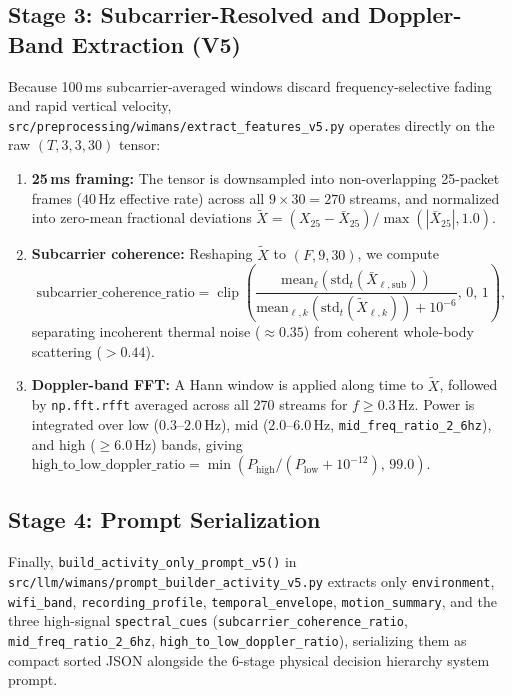 \documentclass[11pt,a4paper]{article}
\begin{document}
\subsection{Stage 3: Subcarrier-Resolved and Doppler-Band Extraction (V5)}
Because 100\,ms subcarrier-averaged windows discard frequency-selective fading and rapid vertical velocity, \texttt{src/preprocessing/wimans/extract\_features\_v5.py} operates directly on the raw $(T, 3, 3, 30)$ tensor:
\begin{enumerate}
    \item \textbf{25\,ms framing:} The tensor is downsampled into non-overlapping 25-packet frames ($40$\,Hz effective rate) across all $9 \times 30 = 270$ streams, and normalized into zero-mean fractional deviations $\tilde{X} = (X_{25} - \bar{X}_{25}) / \max(|\bar{X}_{25}|, 1.0)$.
    \item \textbf{Subcarrier coherence:} Reshaping $\tilde{X}$ to $(F, 9, 30)$, we compute
    \begin{equation}
        \text{subcarrier\_coherence\_ratio} = \operatorname{clip}\!\left(\frac{\text{mean}_{\ell}(\text{std}_t(\bar{X}_{\ell,\text{sub}}))}{\text{mean}_{\ell,k}(\text{std}_t(\tilde{X}_{\ell,k})) + 10^{-6}},\, 0,\, 1\right),
    \end{equation}
    separating incoherent thermal noise ($\approx 0.35$) from coherent whole-body scattering ($>0.44$).
    \item \textbf{Doppler-band FFT:} A Hann window is applied along time to $\tilde{X}$, followed by \texttt{np.fft.rfft} averaged across all 270 streams for $f \ge 0.3$\,Hz. Power is integrated over low ($0.3\text{--}2.0$\,Hz), mid ($2.0\text{--}6.0$\,Hz, \texttt{mid\_freq\_ratio\_2\_6hz}), and high ($\ge 6.0$\,Hz) bands, giving $\text{high\_to\_low\_doppler\_ratio} = \min(P_{\text{high}} / (P_{\text{low}} + 10^{-12}),\, 99.0)$.
\end{enumerate}

\subsection{Stage 4: Prompt Serialization}
Finally, \texttt{build\_activity\_only\_prompt\_v5()} in \texttt{src/llm/wimans/prompt\_builder\_activity\_v5.py} extracts only \texttt{environment}, \texttt{wifi\_band}, \texttt{recording\_profile}, \texttt{temporal\_envelope}, \texttt{motion\_summary}, and the three high-signal \texttt{spectral\_cues} (\texttt{subcarrier\_coherence\_ratio}, \texttt{mid\_freq\_ratio\_2\_6hz}, \texttt{high\_to\_low\_doppler\_ratio}), serializing them as compact sorted JSON alongside the 6-stage physical decision hierarchy system prompt.
\end{document}
